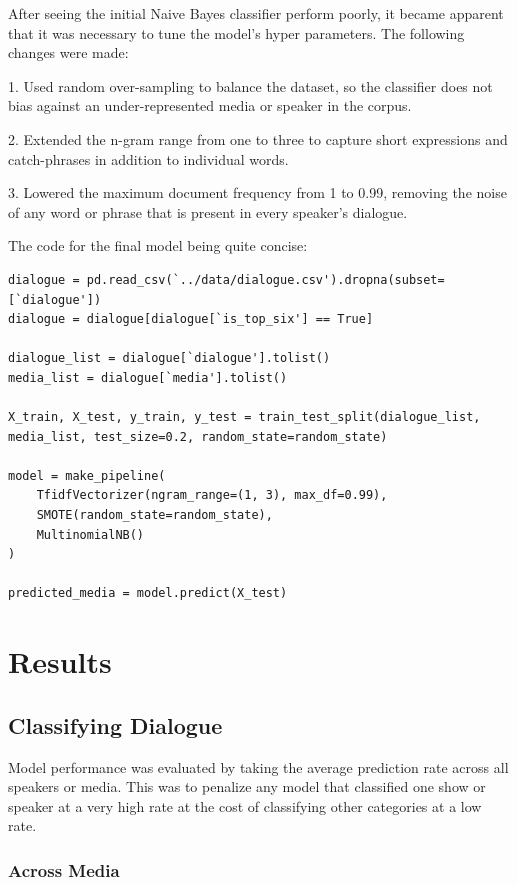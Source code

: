 \documentclass{article}
\begin{document}
\begin{titlepage}
After seeing the initial Naive Bayes classifier perform poorly, it became apparent that it was necessary to tune the model's hyper parameters. The following changes were made:

1. Used random over-sampling to balance the dataset, so the classifier does not bias against an under-represented media or speaker in the corpus.

2. Extended the n-gram range from one to three to capture short expressions and catch-phrases in addition to individual words.

3. Lowered the maximum document frequency from 1 to 0.99, removing the noise of any word or phrase that is present in every speaker's dialogue.

The code for the final model being quite concise:

\begin{verbatim}
dialogue = pd.read_csv(`../data/dialogue.csv').dropna(subset=[`dialogue'])
dialogue = dialogue[dialogue[`is_top_six'] == True]

dialogue_list = dialogue[`dialogue'].tolist()
media_list = dialogue[`media'].tolist()

X_train, X_test, y_train, y_test = train_test_split(dialogue_list, media_list, test_size=0.2, random_state=random_state)

model = make_pipeline(
    TfidfVectorizer(ngram_range=(1, 3), max_df=0.99),
    SMOTE(random_state=random_state),
    MultinomialNB()
)

predicted_media = model.predict(X_test)
\end{verbatim}

\section{Results}

\subsection{Classifying Dialogue}

Model performance was evaluated by taking the average prediction rate across all speakers or media. This was to penalize any model that classified one show or speaker at a very high rate at the cost of classifying other categories at a low rate.

\subsubsection{Across Media}


\end{titlepage}
\end{document}
